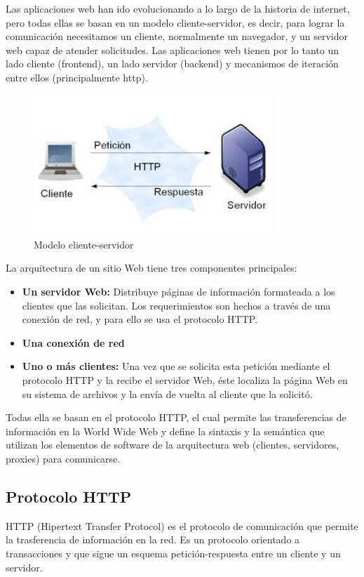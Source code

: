 Las aplicaciones web han ido evolucionando a lo largo de la historia de internet, pero todas ellas se basan en un modelo cliente-servidor, es decir, para lograr la comunicación necesitamos un cliente, normalmente un navegador, y un servidor web capaz de atender solicitudes. Las aplicaciones web tienen por lo tanto un lado cliente (frontend), un lado servidor (backend) y mecanismos de iteración entre ellos (principalmente http).
\begin{figure}[!h]
    \centering
    \includegraphics[width=90mm]{img/introduccion/cliente-server.jpeg}
    \caption[Modelo cliente-servidor]{Modelo cliente-servidor}
\end{figure}

La arquitectura de un sitio Web tiene tres componentes principales:
\begin{itemize}
    \item \textbf {Un servidor Web:} Distribuye páginas de información formateada a los clientes que las solicitan. Los requerimientos son hechos a través de una conexión de red, y para ello se usa el protocolo HTTP.
    \item \textbf {Una conexión de red}
    \item \textbf {Uno o más clientes:} Una vez que se solicita esta petición mediante el protocolo HTTP y la recibe el servidor Web, éste localiza la página Web en su sistema de archivos y la envía de vuelta al cliente que la solicitó.
\end{itemize}

Todas ella se basan en el protocolo HTTP, el cual permite las transferencias de información en la World Wide Web y define la sintaxis y la semántica que utilizan los elementos de software de la arquitectura web (clientes, servidores, proxies) para comunicarse.

\subsection{Protocolo HTTP}
HTTP (Hipertext Transfer Protocol) es el protocolo de comunicación que permite la trasferencia de información en la red. Es un protocolo orientado a transacciones y que sigue un esquema petición-respuesta entre un cliente y un servidor.

